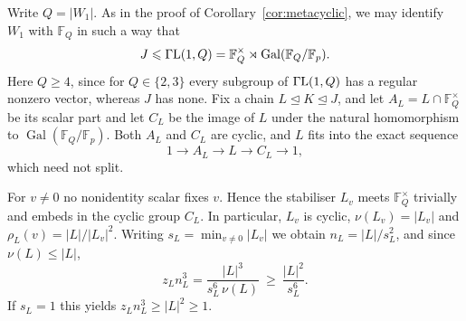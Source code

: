 \documentclass[10pt]{amsart}
\theoremstyle{definition}
\renewcommand{\le}{\leqslant}
\renewcommand{\ge}{\geqslant}
\renewcommand{\leq}{\leqslant}
\let\oldendproof\endproof
\renewenvironment{proof}[1][\proofname]{%
  \oldproof[\bfseries #1]%
}{\oldendproof}
\newcommand{\GammaL}{\Gamma{\rm L}}
\DeclareMathOperator{\Gal}{Gal}
\numberwithin{equation}{section}
\numberwithin{table}{section}
\begin{document}
\begin{proof}
Write $Q=|W_1|$. As in the proof of Corollary~\ref{cor:metacyclic}, we may
identify $W_1$ with $\mathbb{F}_Q$ in such a way that
$$
  J\leq\GammaL(1,Q)
   =\mathbb{F}_Q^\times\rtimes\Gal(\mathbb{F}_Q/\mathbb{F}_p).
$$
Here $Q\ge4$, since for $Q\in\{2,3\}$ every subgroup of $\GammaL(1,Q)$ has a
regular nonzero vector, whereas $J$ has none. Fix a chain
$L\trianglelefteq K\trianglelefteq J$, and let
$A_L=L\cap\mathbb{F}_Q^{\times}$ be its scalar part and let $C_L$ be the image
of $L$ under the natural homomorphism to
$\Gal(\mathbb{F}_Q/\mathbb{F}_p)$. Both $A_L$ and $C_L$ are cyclic, and $L$
fits into the exact sequence
$$
  1\longrightarrow A_L\longrightarrow L\longrightarrow C_L\longrightarrow 1,
$$
which need not split.

For $v\ne0$ no nonidentity scalar fixes $v$. Hence the stabiliser $L_v$ meets
$\mathbb{F}_Q^{\times}$ trivially and embeds in the cyclic group $C_L$. In particular, $L_v$
is cyclic, $\nu(L_v)=|L_v|$ and $\rho_L(v)=|L|/|L_v|^{2}$. Writing
$s_L=\min_{v\ne0}|L_v|$ we obtain $n_L=|L|/s_L^{2}$, and since $\nu(L)\le|L|$,
$$
  z_Ln_L^{3}=\frac{|L|^{3}}{s_L^{6}\,\nu(L)}\ \ge\ \frac{|L|^{2}}{s_L^{6}}.
$$
If $s_L=1$ this yields $z_Ln_L^{3}\ge|L|^{2}\ge1$.


\end{proof}
\end{document}
